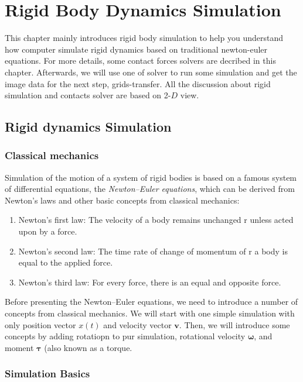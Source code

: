 \chapter{Rigid Body Dynamics Simulation}

This chapter mainly introduces rigid body simulation to help you understand how computer simulate rigid dynamics based on traditional newton-euler equations. For more details, some contact forces solvers are decribed in this chapter. Afterwards, we will use one of solver to run some simulation and get the image data for the next step, grids-transfer. All the discussion about rigid simulation and contacts solver are based on 2-$D$ view.

\section{Rigid dynamics Simulation}

\subsection{Classical mechanics}
Simulation of the motion of a system of rigid bodies is based on a famous system of differential equations, the \textit{Newton–Euler equations}, which can be derived from Newton’s laws and other basic concepts from classical mechanics:

\begin{enumerate}
    \item Newton’s first law: The velocity of a body remains unchanged r unless acted upon by a force.
    \item Newton’s second law: The time rate of change of momentum of r a body is equal to the applied force.
    \item Newton’s third law: For every force, there is an equal and opposite force.
\end{enumerate}

Before presenting the Newton–Euler equations, we need to introduce a number of concepts from classical mechanics. We will start with one simple simulation with only position vector $x(t)$ and velocity vector $\pmb{v}$. Then, we will introduce some concepts by adding rotatiopn to pur simulation, rotational velocity $\pmb{\omega}$, and moment $\pmb{\tau}$ (also known as a torque.


\subsection{Simulation Basics}

